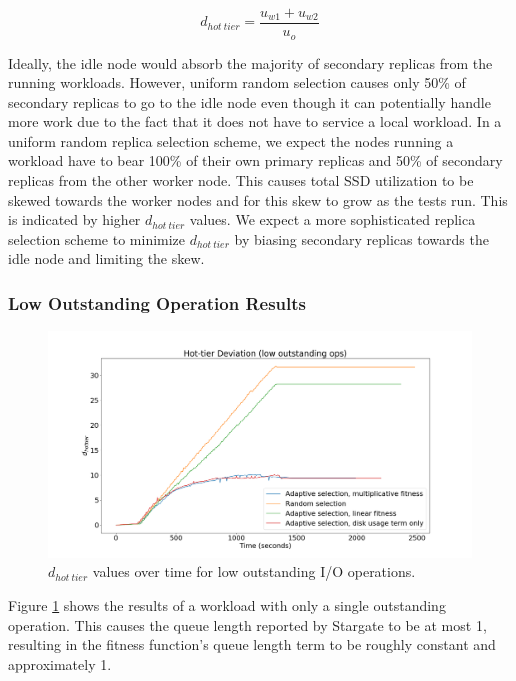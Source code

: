 \documentclass[12pt]{article}
\begin{document}
  \begin{equation}
    d_{hot\ tier} = \frac{u_{w1} + u_{w2}}{u_{o}}
  \end{equation}
  
  Ideally, the idle node would absorb the majority of secondary replicas from
  the running workloads. However, uniform random selection causes only 50\% of
  secondary replicas to go to the idle node even though it can potentially
  handle more work due to the fact that it does not have to service a local
  workload. In a uniform random replica selection scheme, we expect the
  nodes running a workload have to bear 100\% of their own primary replicas and
  50\% of secondary replicas from the other worker node. This causes total SSD
  utilization to be skewed towards the worker nodes and for this skew to grow
  as the tests run. This is indicated by higher $d_{hot\ tier}$ values. We
  expect a more sophisticated replica selection scheme to minimize
  $d_{hot\ tier}$ by biasing secondary replicas towards the idle node and
  limiting the skew.


    \subsubsection{Low Outstanding Operation Results}

    \begin{figure}[h]
      \centering
      \includegraphics[scale=0.30]{images/low_outstanding_exp.png} 
      \caption{$d_{hot\ tier}$ values over time for low outstanding I/O
               operations.}
      \label{fig:low_outstanding_tier_disparity}
    \end{figure}

    Figure \ref{fig:low_outstanding_tier_disparity} shows the results of a
    workload with only a single outstanding operation. This causes the queue
    length reported by Stargate to be at most 1, resulting in the fitness
    function's queue length term to be roughly constant and approximately 1.
    
\end{document}
